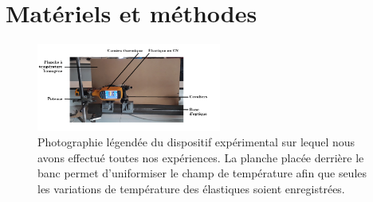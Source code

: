 \section{Matériels et méthodes}
\label{Méthodes et Matériel}

\begin{figure}[h]
  \centering
    \includegraphics[width=0.54\textwidth]{Images/dispositif_legende.png}
     \vspace*{-0.8cm}
    \caption{\small{Photographie légendée du dispositif expérimental sur lequel nous avons effectué toutes nos expériences. La planche placée derrière le banc permet d'uniformiser le champ de température afin que seules les variations de température des élastiques soient enregistrées.}}
        \label{dispositifexp}
    \vspace*{-0.4 cm}
\end{figure}









